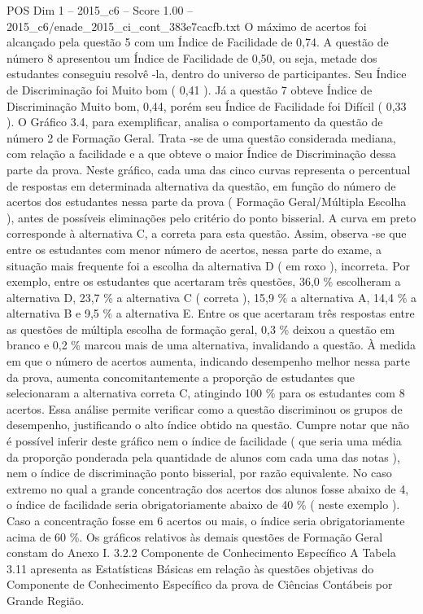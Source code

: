 \begin{textsample}{POS Dim 1 – 2015\_c6 – Score 1.00 – 2015\_c6/enade\_2015\_ci\_cont\_383e7cacfb.txt}
O máximo de acertos foi alcançado pela questão 5 com um Índice de Facilidade de 0,74.
A questão de número 8 apresentou um Índice de Facilidade de 0,50, ou seja, metade dos estudantes conseguiu resolvê -la, dentro do universo de participantes.
Seu Índice de Discriminação foi Muito bom ( 0,41 ).
Já a questão 7 obteve Índice de Discriminação Muito bom, 0,44, porém seu Índice de Facilidade foi Difícil ( 0,33 ).
O Gráfico 3.4, para exemplificar, analisa o comportamento da questão de número 2 de Formação Geral.
Trata -se de uma questão considerada mediana, com relação a facilidade e a que obteve o maior Índice de Discriminação dessa parte da prova.
Neste gráfico, cada uma das cinco curvas representa o percentual de respostas em determinada alternativa da questão, em função do número de acertos dos estudantes nessa parte da prova ( Formação Geral/Múltipla Escolha ), antes de possíveis eliminações pelo critério do ponto bisserial.
A curva em preto corresponde à alternativa C, a correta para esta questão.
Assim, observa -se que entre os estudantes com menor número de acertos, nessa parte do exame, a situação mais frequente foi a escolha da alternativa D ( em roxo ), incorreta.
Por exemplo, entre os estudantes que acertaram três questões, 36,0 \% escolheram a alternativa D, 23,7 \% a alternativa C ( correta ), 15,9 \% a alternativa A, 14,4 \% a alternativa B e 9,5 \% a alternativa E.
Entre os que acertaram três respostas entre as questões de múltipla escolha de formação geral, 0,3 \% deixou a questão em branco e 0,2 \% marcou mais de uma alternativa, invalidando a questão.
À medida em que o número de acertos aumenta, indicando desempenho melhor nessa parte da prova, aumenta concomitantemente a proporção de estudantes que selecionaram a alternativa correta C, atingindo 100 \% para os estudantes com 8 acertos.
Essa análise permite verificar como a questão discriminou os grupos de desempenho, justificando o alto índice obtido na questão.
Cumpre notar que não é possível inferir deste gráfico nem o índice de facilidade ( que seria uma média da proporção ponderada pela quantidade de alunos com cada uma das notas ), nem o índice de discriminação ponto bisserial, por razão equivalente.
No caso extremo no qual a grande concentração dos acertos dos alunos fosse abaixo de 4, o índice de facilidade seria obrigatoriamente abaixo de 40 \% ( neste exemplo ).
Caso a concentração fosse em 6 acertos ou mais, o índice seria obrigatoriamente acima de 60 \%.
Os gráficos relativos às demais questões de Formação Geral constam do Anexo I. 3.2.2 Componente de Conhecimento Específico A Tabela 3.11 apresenta as Estatísticas Básicas em relação às questões objetivas do Componente de Conhecimento Específico da prova de Ciências Contábeis por Grande Região.

\end{textsample}

